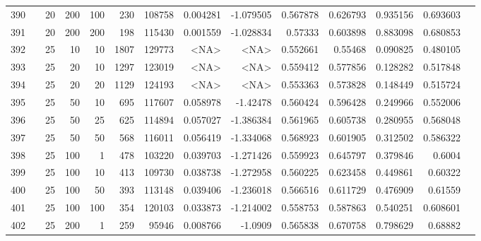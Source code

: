 \begin{longtable}{llrrrrrrrrrrrr}
		390 & &           20 &               200 &          100 &         230 &     108758 &  0.004281 & -1.079505 &  0.567878 &    0.626793 &       0.935156 &  0.693603 \\
		391 & &           20 &               200 &          200 &         198 &     115430 &  0.001559 & -1.028834 &   0.57333 &    0.603898 &       0.883098 &  0.680853 \\
		392 & &           25 &                10 &           10 &           1807 &     129773 &      <NA> &      <NA> &  0.552661 &     0.55468 &       0.090825 &  0.480105 \\
		393 & &           25 &                20 &           10 &           1297 &     123019 &      <NA> &      <NA> &  0.559412 &    0.577856 &       0.128282 &  0.517848 \\
		394 & &           25 &                20 &           20 &           1129 &     124193 &      <NA> &      <NA> &  0.553363 &    0.573828 &       0.148449 &  0.515724 \\
		395 & &           25 &                50 &           10 &         695 &     117607 &  0.058978 &  -1.42478 &  0.560424 &    0.596428 &       0.249966 &  0.552006 \\
		396 & &           25 &                50 &           25 &         625 &     114894 &  0.057027 & -1.386384 &  0.561965 &    0.605738 &       0.280955 &  0.568048 \\
		397 & &           25 &                50 &           50 &         568 &     116011 &  0.056419 & -1.334068 &  0.568923 &    0.601905 &       0.312502 &  0.586322 \\
		398 & &           25 &               100 &            1 &         478 &     103220 &  0.039703 & -1.271426 &  0.559923 &    0.645797 &       0.379846 &    0.6004 \\
		399 & &           25 &               100 &           10 &         413 &     109730 &  0.038738 & -1.272958 &  0.560225 &    0.623458 &       0.449861 &   0.60322 \\
		400 & &           25 &               100 &           50 &         393 &     113148 &  0.039406 & -1.236018 &  0.566516 &    0.611729 &       0.476909 &   0.61559 \\
		401 & &           25 &               100 &          100 &         354 &     120103 &  0.033873 & -1.214002 &  0.558753 &    0.587863 &       0.540251 &  0.608601 \\
		402 & &           25 &               200 &            1 &         259 &      95946 &  0.008766 &   -1.0909 &  0.565838 &    0.670758 &       0.798629 &   0.68882 \\

\end{longtable}
